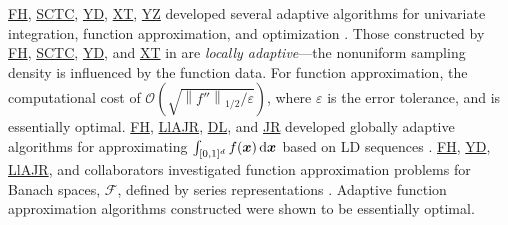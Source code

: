 \documentclass[11pt]{NSFamsart}
\newcommand{\FH}{\hyperlink{FHlink}{FH}\xspace}
\newcommand{\SCTC}{\hyperlink{SCTClink}{SCTC}\xspace}
\newcommand{\YD}{\hyperlink{YDlink}{YD}\xspace}
\newcommand{\JR}{\hyperlink{JRlink}{JR}\xspace}
\newcommand{\LlAJR}{\hyperlink{LlAJRlink}{LlAJR}\xspace}
\newcommand{\XT}{\hyperlink{XTlink}{XT}\xspace}
\newcommand{\DL}{\hyperlink{DLlink}{DL}\xspace}
\newcommand{\YZ}{\hyperlink{YZlink}{YZ}\xspace}
\newcommand{\bx}{{\boldsymbol{x}}}
\def\dif{\textup{d}}
\newcommand{\calf}{{\mathcal{F}}}
\def\abs#1{\ensuremath{\left \lvert #1 \right \rvert}}
\newcommand{\norm}[2][{}]{\ensuremath{\left \lVert #2 \right \rVert}_{#1}}
\newcommand{\Order}{\mathcal{O}}
\begin{document}

\FH, \SCTC, \YD, \XT, \YZ developed several adaptive algorithms for univariate integration, function approximation, and optimization \cite{ChoEtal17a,HicEtal14b,  Din15a, Ton14a, Zha18a}.  Those constructed by \FH, \SCTC, \YD, and \XT in \cite{ChoEtal17a} are \emph{locally adaptive}---the nonuniform sampling density is influenced by the function data.  For function approximation, the computational cost of $\Order\left(\sqrt{\norm[1/2]{f''}/\varepsilon} \right)$, where $\varepsilon$ is the error tolerance, and is essentially optimal. 
\FH, \LlAJR, \DL, and \JR developed globally adaptive algorithms for approximating $\int_{[0,1]^d} f(\bx) \, \dif \bx$ based on LD sequences \cite{HicJim16a,HicEtal17a,JimHic16a}. 
\FH, \YD, \LlAJR, and collaborators investigated function approximation problems for Banach spaces, $\calf$, defined by series representations \cite{DinHic20a,DinEtal20a}.  Adaptive function approximation algorithms constructed were shown to be essentially optimal.


\end{document}

